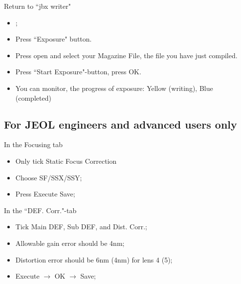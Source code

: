 Return to ``jbx writer"
\begin{itemize}
\item {};
\item Press ``Exposure" button.
\item Press open and select your Magazine File, the file you have just compiled.
\item Press ``Start Exposure"-button, press OK.
\item  You  can  monitor,  the  progress of  exposure:  Yellow  (writing),  Blue
  (completed)
\end{itemize}

\subsection{For JEOL engineers and advanced users only}

In the {Focusing} tab
\begin{itemize}
\item Only tick {Static Focus Correction}
\item Choose SF/SSX/SSY;
\item Press Execute \ira Save;
\end{itemize}
In the ``DEF. Corr."-tab
\begin{itemize}
\item Tick {Main DEF}, {Sub DEF}, and {Dist. Corr.};
\item Allowable gain error should be 4nm;
\item Distortion error should be 6nm (4nm) for lens 4 (5);
\item Execute $\rightarrow$ OK $\rightarrow$ Save;
\end{itemize}

